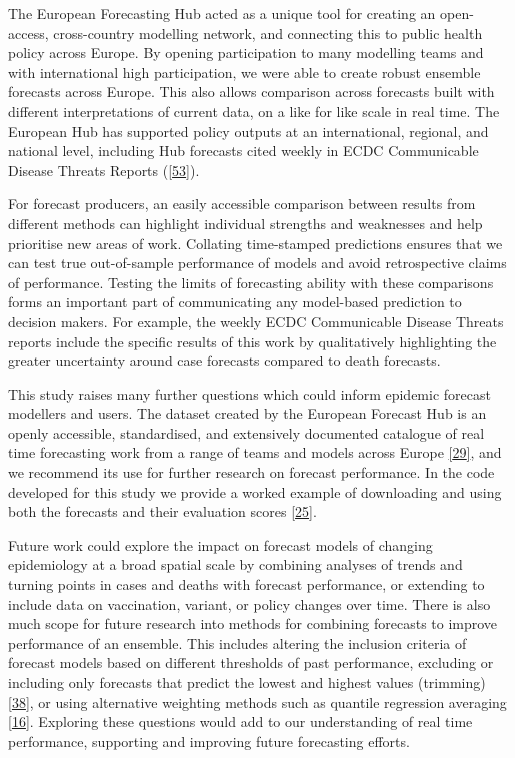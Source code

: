 \documentclass[
]{article}
\begin{document}
The European Forecasting Hub acted as a unique tool for creating an open-access, cross-country modelling network, and connecting this to public health policy across Europe. By opening participation to many modelling teams and with international high participation, we were able to create robust ensemble forecasts across Europe. This also allows comparison across forecasts built with different interpretations of current data, on a like for like scale in real time. The European Hub has supported policy outputs at an international, regional, and national level, including Hub forecasts cited weekly in ECDC Communicable Disease Threats Reports (\protect\hyperlink{ref-europeancentrefordiseasepreventionandcontrolWeeklyThreatsReports}{{[}53{]}}).

For forecast producers, an easily accessible comparison between results from different methods can highlight individual strengths and weaknesses and help prioritise new areas of work. Collating time-stamped predictions ensures that we can test true out-of-sample performance of models and avoid retrospective claims of performance. Testing the limits of forecasting ability with these comparisons forms an important part of communicating any model-based prediction to decision makers. For example, the weekly ECDC Communicable Disease Threats reports include the specific results of this work by qualitatively highlighting the greater uncertainty around case forecasts compared to death forecasts.

This study raises many further questions which could inform epidemic forecast modellers and users. The dataset created by the European Forecast Hub is an openly accessible, standardised, and extensively documented catalogue of real time forecasting work from a range of teams and models across Europe \protect\hyperlink{ref-europeancovid-19forecasthubEuropeanCovid19Forecast}{{[}29{]}}, and we recommend its use for further research on forecast performance. In the code developed for this study we provide a worked example of downloading and using both the forecasts and their evaluation scores \protect\hyperlink{ref-PredictivePerformanceMultimodel2022}{{[}25{]}}.

Future work could explore the impact on forecast models of changing epidemiology at a broad spatial scale by combining analyses of trends and turning points in cases and deaths with forecast performance, or extending to include data on vaccination, variant, or policy changes over time. There is also much scope for future research into methods for combining forecasts to improve performance of an ensemble. This includes altering the inclusion criteria of forecast models based on different thresholds of past performance, excluding or including only forecasts that predict the lowest and highest values (trimming) \protect\hyperlink{ref-taylorCombiningProbabilisticForecasts2021}{{[}38{]}}, or using alternative weighting methods such as quantile regression averaging \protect\hyperlink{ref-funkShorttermForecastsInform2020}{{[}16{]}}. Exploring these questions would add to our understanding of real time performance, supporting and improving future forecasting efforts.
\end{document}
